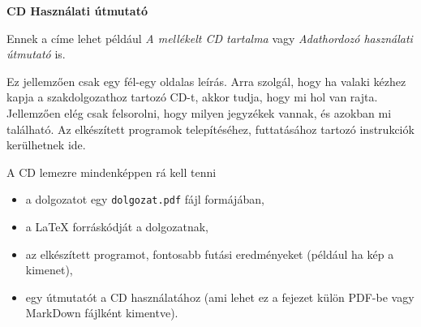 \pagestyle{empty}

\noindent \textbf{\Large CD Használati útmutató}

\vskip 1cm


Ennek a címe lehet például \textit{A mellékelt CD tartalma} vagy \textit{Adathordozó használati útmutató} is.

Ez jellemzően csak egy fél-egy oldalas leírás.
Arra szolgál, hogy ha valaki kézhez kapja a szakdolgozathoz tartozó CD-t, akkor tudja, hogy mi hol van rajta.
Jellemzően elég csak felsorolni, hogy milyen jegyzékek vannak, és azokban mi található.
Az elkészített programok telepítéséhez, futtatásához tartozó instrukciók kerülhetnek ide.

A CD lemezre mindenképpen rá kell tenni
\begin{itemize}
\item a dolgozatot egy \texttt{dolgozat.pdf} fájl formájában,
\item a LaTeX forráskódját a dolgozatnak,
\item az elkészített programot, fontosabb futási eredményeket (például ha kép a kimenet),
\item egy útmutatót a CD használatához (ami lehet ez a fejezet külön PDF-be vagy MarkDown fájlként kimentve).
\end{itemize}
